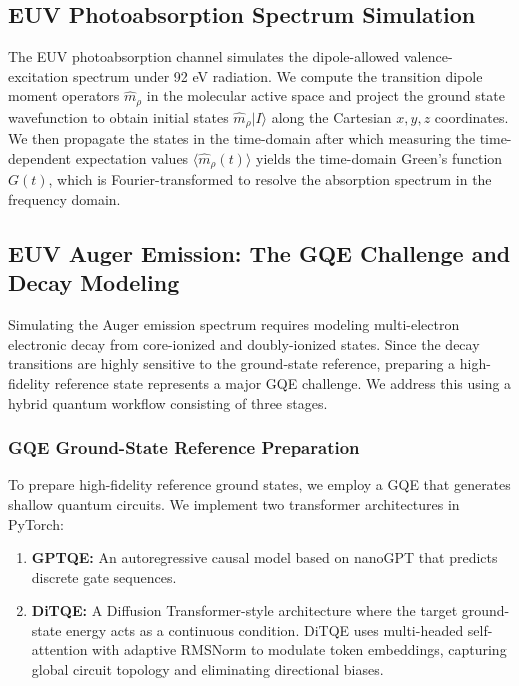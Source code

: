 \documentclass[11pt]{article}
\begin{document}
\subsection{EUV Photoabsorption Spectrum Simulation}
The EUV photoabsorption channel simulates the dipole-allowed valence-excitation spectrum under 92 eV radiation. We compute the transition dipole moment operators $\hat{m}_\rho$ in the molecular active space and project the ground state wavefunction to obtain initial states $\hat{m}_\rho |I\rangle$ along the Cartesian $x,y,z$ coordinates. We then propagate the states in the time-domain after which measuring the time-dependent expectation values $\langle\hat{m}_\rho(t)\rangle$ yields the time-domain Green's function $G(t)$, which is Fourier-transformed to resolve the absorption spectrum in the frequency domain.

\subsection{EUV Auger Emission: The GQE Challenge and Decay Modeling}
Simulating the Auger emission spectrum requires modeling multi-electron electronic decay from core-ionized and doubly-ionized states. Since the decay transitions are highly sensitive to the ground-state reference, preparing a high-fidelity reference state represents a major GQE challenge. We address this using a hybrid quantum workflow consisting of three stages.

\subsubsection{GQE Ground-State Reference Preparation}
To prepare high-fidelity reference ground states, we employ a GQE that generates shallow quantum circuits. We implement two transformer architectures in PyTorch:
\begin{enumerate}[noitemsep,topsep=0pt]
  \item \textbf{GPTQE:} An autoregressive causal model based on nanoGPT that predicts discrete gate sequences.
  \item \textbf{DiTQE:} A Diffusion Transformer-style architecture where the target ground-state energy acts as a continuous condition. DiTQE uses multi-headed self-attention with adaptive RMSNorm to modulate token embeddings, capturing global circuit topology and eliminating directional biases.
\end{enumerate}
\end{document}
